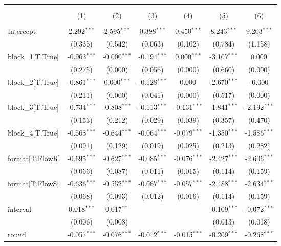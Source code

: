 \begin{table}[!htbp] \centering
\begin{tabular}{@{\extracolsep{5pt}}lcccccc}
\\[-1.8ex]\hline
\hline \\[-1.8ex]
\\[-1.8ex] & (1) & (2) & (3) & (4) & (5) & (6) \\
\hline \\[-1.8ex]
 Intercept & 2.292$^{***}$ & 2.595$^{***}$ & 0.388$^{***}$ & 0.450$^{***}$ & 8.243$^{***}$ & 9.203$^{***}$ \\
& (0.335) & (0.542) & (0.063) & (0.102) & (0.784) & (1.158) \\
 block_1[T.True] & -0.963$^{***}$ & -0.000$^{***}$ & -0.194$^{***}$ & 0.000$^{***}$ & -3.107$^{***}$ & 0.000$^{}$ \\
& (0.275) & (0.000) & (0.056) & (0.000) & (0.660) & (0.000) \\
 block_2[T.True] & -0.861$^{***}$ & 0.000$^{***}$ & -0.128$^{***}$ & 0.000$^{}$ & -2.670$^{***}$ & -0.000$^{}$ \\
& (0.211) & (0.000) & (0.041) & (0.000) & (0.517) & (0.000) \\
 block_3[T.True] & -0.734$^{***}$ & -0.808$^{***}$ & -0.113$^{***}$ & -0.131$^{***}$ & -1.841$^{***}$ & -2.192$^{***}$ \\
& (0.153) & (0.212) & (0.029) & (0.039) & (0.357) & (0.470) \\
 block_4[T.True] & -0.568$^{***}$ & -0.644$^{***}$ & -0.064$^{***}$ & -0.079$^{***}$ & -1.350$^{***}$ & -1.586$^{***}$ \\
& (0.091) & (0.129) & (0.019) & (0.025) & (0.213) & (0.282) \\
 format[T.FlowR] & -0.695$^{***}$ & -0.627$^{***}$ & -0.085$^{***}$ & -0.076$^{***}$ & -2.427$^{***}$ & -2.606$^{***}$ \\
& (0.066) & (0.087) & (0.011) & (0.015) & (0.114) & (0.159) \\
 format[T.FlowS] & -0.636$^{***}$ & -0.552$^{***}$ & -0.067$^{***}$ & -0.057$^{***}$ & -2.488$^{***}$ & -2.634$^{***}$ \\
& (0.068) & (0.093) & (0.012) & (0.016) & (0.114) & (0.159) \\
 interval & 0.018$^{***}$ & 0.017$^{**}$ & & & -0.109$^{***}$ & -0.072$^{***}$ \\
& (0.006) & (0.008) & & & (0.013) & (0.018) \\
 round & -0.057$^{***}$ & -0.076$^{***}$ & -0.012$^{***}$ & -0.015$^{***}$ & -0.209$^{***}$ & -0.268$^{***}$ \\

\end{tabular}
\end{table}
